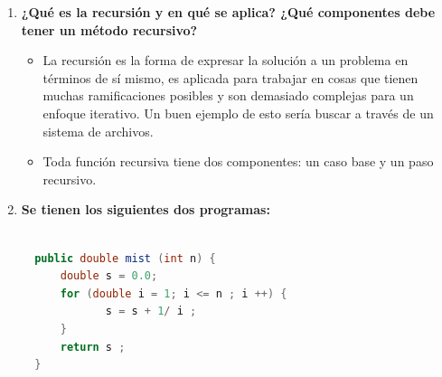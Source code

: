 \documentclass{report}
\begin{document}
\begin{enumerate}
    \item \textbf{¿Qué es la recursión y en qué se aplica? ¿Qué componentes debe tener un método recursivo?}
		    \begin{itemize}	
             \item La recursión es la forma de expresar la solución a un problema en términos de sí mismo, es aplicada para trabajar en cosas que tienen muchas ramificaciones posibles y son demasiado complejas para un enfoque iterativo. Un buen ejemplo de esto sería buscar a través de un sistema de archivos. 
             \item Toda función recursiva tiene dos componentes: un caso base y un paso recursivo. 
	        \end{itemize}
    \item \textbf{Se tienen los siguientes dos programas:}
			\newline
            \begin{lstlisting}[language=Java, caption=mist]

  public double mist (int n) {
      double s = 0.0;
      for (double i = 1; i <= n ; i ++) {
             s = s + 1/ i ;
      }
      return s ;
  }	
            \end{lstlisting}
            \begin{lstlisting}[language=Java, caption=mistR]


\end{lstlisting}
\end{enumerate}
\end{document}
